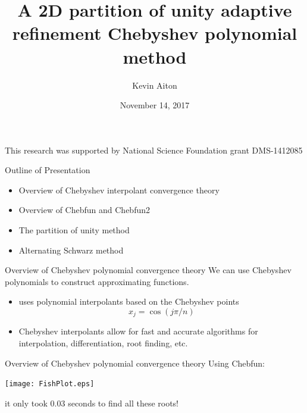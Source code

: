 \documentclass{beamer}
\title[Optimal Domain Splitting]{A 2D partition of unity adaptive refinement Chebyshev polynomial method}
\author[K. Aiton]{Kevin Aiton}
\institute[UD]{
  Department of Mathematics\\
University of Delaware\\
}
\date[November 2017]{November 14, 2017}
\begin{document}
%
%
\begin{frame}[plain]
  \titlepage
  \begin{center}
  This research was supported by National Science Foundation grant DMS-1412085
  \end{center}
\end{frame}

%
%

\begin{frame}[plain]{Outline of Presentation}

\begin{itemize}
	\item Overview of Chebyshev interpolant convergence theory
	\item Overview of Chebfun and Chebfun2
	\item The partition of unity method
	\item Alternating Schwarz method
\end{itemize}
\end{frame}

%
%
\begin{frame}{Overview of Chebyshev polynomial convergence theory}
We can use Chebyshev polynomials to construct approximating functions.
\begin{itemize}
\item {} uses polynomial interpolants based on the Chebyshev points $$x_j = \cos(j\pi/n)$$	
\item Chebyshev interpolants allow for fast and accurate algorithms for
interpolation, differentiation, root finding, etc.
\end{itemize}
\end{frame}

\begin{frame}{Overview of Chebyshev polynomial convergence theory}
Using Chebfun:	
\bigskip

\begin{center}
\texttt{[image: FishPlot.eps]}
\end{center}
\begin{center}
it only took 0.03 seconds to find all these roots!	
\end{center}

\end{frame}
\end{document}
